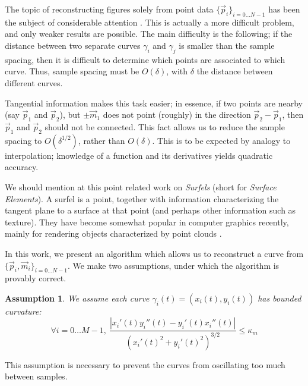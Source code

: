 \documentclass{article}
\newtheorem{assumption}{Assumption}
\numberwithin{cntr}{section}
\numberwithin{equation}{section}
\newcommand{\abs}[1]{\left| #1 \right|}%
\newcommand{\vp}[0]{{\vec{p}}}
\newcommand{\vm}[0]{{\vec{m}}}
\newcommand{\Oto}[1]{{0 \ldots #1-1}}
\newcommand{\OtoN}{{0 \ldots N-1}}
\newcommand{\pointData}{{ \{ \vp_{i} \}_{i=\OtoN} }}
\newcommand{\allData}{{ \{ \vp_{i}, \vm_{i} \}_{i=\OtoN} }}
\newcommand{\curvemax}{{\kappa_{m}}}
\newcommand{\curvesep}{{\delta}}
\begin{document}
The topic of reconstructing figures solely from point data $\pointData$ has been the subject of considerable attention \cite{amenta98crust,amenta98new,dey99curve,hoppe92surface,amenta02simple, dey01reconstructing, edelsbrunner}. This is actually a more difficult problem, and only weaker results are possible. The main difficulty is the following; if the distance between two separate curves $\gamma_{i}$ and $\gamma_{j}$ is smaller than the sample spacing, then it is difficult to determine which points are associated to which curve. Thus, sample spacing must be $O(\curvesep)$, with $\curvesep$ the distance between different curves.

Tangential information makes this task easier; in essence, if two points are nearby (say $\vp_{1}$ and $\vp_{2}$), but $\pm \vm_{1}$ does not point (roughly) in the direction $\vp_{2}-\vp_{1}$, then $\vp_{1}$ and $\vp_{2}$ should not be connected. This fact allows us to reduce the sample spacing to $O(\curvesep^{1/2})$, rather than $O(\curvesep)$. This is to be expected by analogy to interpolation; knowledge of a function and its derivatives yields quadratic accuracy.

We should mention at this point related work on \emph{Surfels} (short for \emph{Surface Elements}). A surfel is a point, together with information characterizing the tangent plane to a surface at that point (and perhaps other information such as texture). They have become somewhat popular in computer graphics recently, mainly for rendering objects characterized by point clouds
\cite{882320,1103907,598521,1018057,344936,383300}.

In this work, we present an algorithm which allows us to reconstruct a curve from $\allData$. We make two assumptions, under which the algorithm is provably correct.

\begin{assumption}
  \label{ass:curvature}
  We assume each curve $\gamma_{i}(t) = (x_i(t),y_i(t))$ has bounded curvature:
  \begin{equation}
    \label{eq:curvatureAssumption}
    \forall i = \Oto{M}, ~ \frac{
      \abs{x_{i}'(t) y_{i}''(t) - y_{i}'(t) x_{i}''(t)}
    } {
      (x_{i}'(t)^{2}+y_{i}'(t)^{2})^{3/2}
    } \leq \curvemax
  \end{equation}
\end{assumption}

This assumption is necessary to prevent the curves from oscillating too much between samples.
\end{document}
